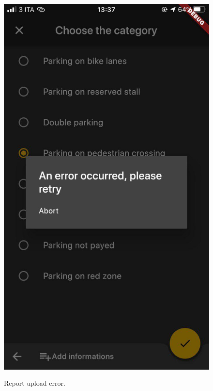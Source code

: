 \documentclass[../ATD.tex]{subfiles}
\begin{document}
    \begin{figure}[H]
        \centering
        \includegraphics[scale = 0.25]{assets/report_upload_error.png}\\
        \caption[Report upload error]{Report upload error.}
    \end{figure}
\end{document}
